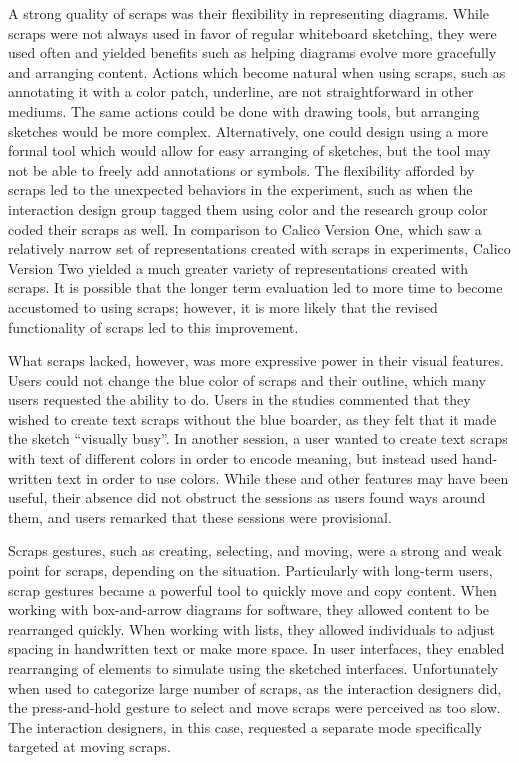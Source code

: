 \documentclass[12pt,fleqn]{ucithesis}
\begin{document}
A strong quality of scraps was their flexibility in representing diagrams. While scraps were not always used in favor of regular whiteboard sketching, they were used often and yielded benefits such as helping diagrams evolve more gracefully and arranging content. Actions which become natural when using scraps, such as annotating it with a color patch, underline, are not straightforward in other mediums. The same actions could be done with drawing tools, but arranging sketches would be more complex. Alternatively, one could design using a more formal tool which would allow for easy arranging of sketches, but the tool may not be able to freely add annotations or symbols. The flexibility afforded by scraps led to the unexpected behaviors in the experiment, such as when the interaction design group tagged them using color and the research group color coded their scraps as well. In comparison to Calico Version One, which saw a relatively narrow set of representations created with scraps in experiments, Calico Version Two yielded a much greater variety of representations created with scraps. It is possible that the longer term evaluation led to more time to become accustomed to using scraps; however, it is more likely that the revised functionality of scraps led to this improvement.

What scraps lacked, however, was more expressive power in their visual features. Users could not change the blue color of scraps and their outline, which many users requested the ability to do. Users in the studies commented that they wished to create text scraps without the blue boarder, as they felt that it made the sketch ``visually busy''. In another session, a user wanted to create text scraps with text of different colors in order to encode meaning, but instead used hand-written text in order to use colors. While these and other features may have been useful, their absence did not obstruct the sessions as users found ways around them, and users remarked that these sessions were provisional.

Scraps gestures, such as creating, selecting, and moving, were a strong and weak point for scraps, depending on the situation. Particularly with long-term users, scrap gestures became a powerful tool to quickly move and copy content. When working with box-and-arrow diagrams for software, they allowed content to be rearranged quickly. When working with lists, they allowed individuals to adjust spacing in handwritten text or make more space. In user interfaces, they enabled rearranging of elements to simulate using the sketched interfaces. Unfortunately when used to categorize large number of scraps, as the interaction designers did, the press-and-hold gesture to select and move scraps were perceived as too slow. The interaction designers, in this case, requested a separate mode specifically targeted at moving scraps.
\end{document}
